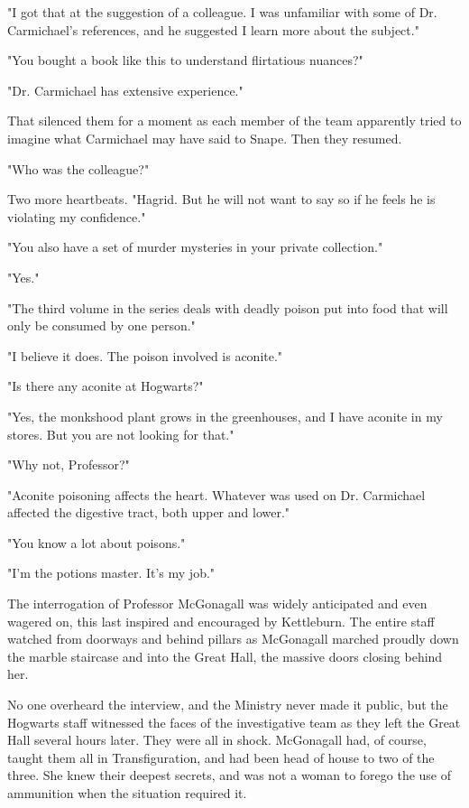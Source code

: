 "I got that at the suggestion of a colleague. I was unfamiliar with some of Dr. Carmichael's references, and he suggested I learn more about the subject."

"You bought a book like this to understand flirtatious nuances?"

"Dr. Carmichael has extensive experience."

That silenced them for a moment as each member of the team apparently tried to imagine what Carmichael may have said to Snape. Then they resumed.

"Who was the colleague?"

Two more heartbeats. "Hagrid. But he will not want to say so if he feels he is violating my confidence."

"You also have a set of murder mysteries in your private collection."

"Yes."

"The third volume in the series deals with deadly poison put into food that will only be consumed by one person."

"I believe it does. The poison involved is aconite."

"Is there any aconite at Hogwarts?"

"Yes, the monkshood plant grows in the greenhouses, and I have aconite in my stores. But you are not looking for that."

"Why not, Professor?"

"Aconite poisoning affects the heart. Whatever was used on Dr. Carmichael affected the digestive tract, both upper and lower."

"You know a lot about poisons."

"I'm the potions master. It's my job."

The interrogation of Professor McGonagall was widely anticipated and even wagered on, this last inspired and encouraged by Kettleburn. The entire staff watched from doorways and behind pillars as McGonagall marched proudly down the marble staircase and into the Great Hall, the massive doors closing behind her.

No one overheard the interview, and the Ministry never made it public, but the Hogwarts staff witnessed the faces of the investigative team as they left the Great Hall several hours later. They were all in shock. McGonagall had, of course, taught them all in Transfiguration, and had been head of house to two of the three. She knew their deepest secrets, and was not a woman to forego the use of ammunition when the situation required it.

